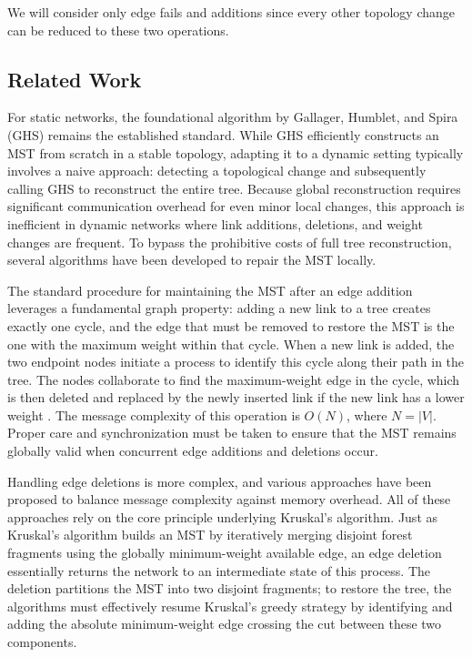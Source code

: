We will consider only edge fails and additions since every other topology change can be reduced to these two operations.

\subsection{Related Work}

For static networks, the foundational algorithm by Gallager, Humblet, and Spira (GHS)\cite{GHS1983} remains the established standard. While GHS efficiently constructs an MST from scratch in a stable topology, adapting it to a dynamic setting typically involves a naive approach: detecting a topological change and subsequently calling GHS to reconstruct the entire tree. Because global reconstruction requires significant communication overhead for even minor local changes, this approach is inefficient in dynamic networks where link additions, deletions, and weight changes are frequent. To bypass the prohibitive costs of full tree reconstruction, several algorithms have been developed to repair the MST locally.

The standard procedure for maintaining the MST after an edge addition leverages a fundamental graph property: adding a new link to a tree creates exactly one cycle, and the edge that must be removed to restore the MST is the one with the maximum weight within that cycle. When a new link is added, the two endpoint nodes initiate a process to identify this cycle along their path in the tree. The nodes collaborate to find the maximum-weight edge in the cycle, which is then deleted and replaced by the newly inserted link if the new link has a lower weight \cite{cheng1988protocolmaintainmst}. The message complexity of this operation is $O(N)$, where $N = |V|$. Proper care and synchronization must be taken to ensure that the MST remains globally valid when concurrent edge additions and deletions occur.

Handling edge deletions is more complex, and various approaches have been proposed to balance message complexity against memory overhead. All of these approaches rely on the core principle underlying Kruskal's algorithm. Just as Kruskal's algorithm builds an MST by iteratively merging disjoint forest fragments using the globally minimum-weight available edge, an edge deletion essentially returns the network to an intermediate state of this process. The deletion partitions the MST into two disjoint fragments; to restore the tree, the algorithms must effectively resume Kruskal's greedy strategy by identifying and adding the absolute minimum-weight edge crossing the cut between these two components.

